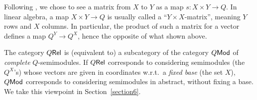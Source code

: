  
 \begin{remark}
 Following \cite{Manzo2013, Hofmann2014, Ehrhard2005}, we 
 chose to see a matrix from $X$ to $Y$ as a map $s:X\times Y\to Q$.
% 
In linear algebra, a map $X\times Y\to Q$ is usually called a ``$Y\times X$-matrix'', meaning $Y$ rows and $X$ columns.
In particular, the product of such a matrix for a vector defines a map $Q^Y\to Q^X$, hence the opposite of what shown above.
\end{remark}
%
%
%
%

\begin{remark}
 The category $Q \mathsf{Rel}$ is (equivalent to) a subcategory of the category $Q\mathsf{Mod}$ of \emph{complete} $Q$-semimodules.
 If $Q \mathsf{Rel}$ corresponds to considering semimodules (the $Q^X$'s) whose vectors are given in coordinates w.r.t.\ a \emph{fixed base} (the set $X$), $Q\mathsf{Mod}$ corresponds to considering semimodules in abstract, without fixing a base.
 We take this viewpoint in Section~\ref{section6}.
\end{remark}



